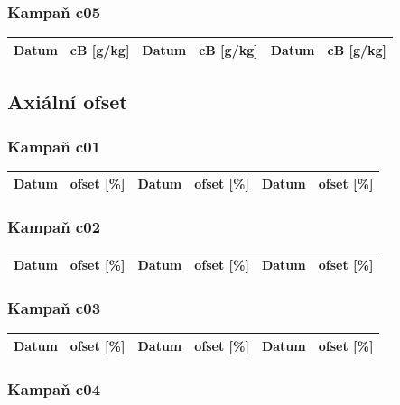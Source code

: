 \documentclass[a4paper,twoside,11pt]{article}
\begin{document}
\subsubsection{Kampaň c05}

\begin{tabular}{|l|l||l|l||l|l|}
\hline
Datum & cB [g/kg] & Datum & cB [g/kg] & Datum & cB [g/kg] \\
\hline

\end{tabular}



\subsection{Axiální ofset}



\subsubsection{Kampaň c01}

\begin{tabular}{|l|l||l|l||l|l|}
\hline
Datum & ofset [\%] & Datum & ofset [\%] & Datum & ofset [\%]\\
\hline

\end{tabular}



\subsubsection{Kampaň c02}

\begin{tabular}{|l|l||l|l||l|l|}
\hline
Datum & ofset [\%] & Datum & ofset [\%] & Datum & ofset [\%]\\
\hline

\end{tabular}



\subsubsection{Kampaň c03}

\begin{tabular}{|l|l||l|l||l|l|}
\hline
Datum & ofset [\%] & Datum & ofset [\%] & Datum & ofset [\%]\\
\hline

\end{tabular}



\subsubsection{Kampaň c04}
\end{document}
